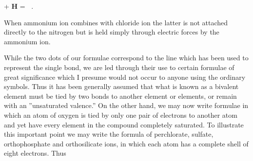 \documentclass[11pt]{memoir}
\begin{document}
\renewcommand*\printatom[1]{\ensuremath{\mathbf{#1}}}




%


\bigskip

\begin{center}
 + \textbf{H} = $\;\; .$
\end{center}

\bigskip

\noindent When ammonium ion combines with chloride ion the latter is not attached directly to the nitrogen but is held simply through electric forces by the ammonium ion.

While the two dots of our formulae correspond to the line which has been used to represent the single bond, we are led through their use to certain formulae of great significance which I presume would not occur to anyone using the ordinary symbols.  Thus it has been generally assumed that what is known as a bivalent element must be tied by two bonds to another element or elements, or remain with an ''unsaturated valence.''  On the other hand, we may now write formulae in which an atom of oxygen is tied by only one pair of electrons to another atom and yet have every element in the compound completely saturated.  To illustrate this important point we may write the formula of perchlorate, sulfate, orthophosphate and orthosilicate ions, in which each atom has a complete shell of eight electrons.  Thus %

\renewcommand*\printatom[1]{\ensuremath{\mathbf{#1}}}



\end{document}
